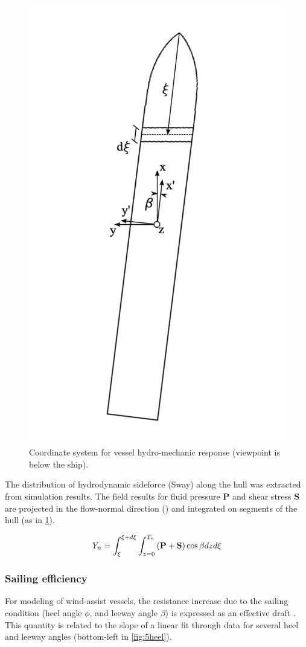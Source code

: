 \documentclass[twoside,twocolumn]{article}
\begin{document}
\begin{figure}[!ht]
	\centering
	\includegraphics[width=.7\columnwidth]{images/cut_coordinates.png}  %
	\caption{Coordinate system for vessel hydro-mechanic response (viewpoint is below the ship).}
	\label{fig:cutcoord}
\end{figure}

The distribution of hydrodynamic sideforce (Sway) along the hull was extracted from simulation results. The field results for fluid pressure $\mathbf{P}$ and shear stress $\mathbf{S}$ are projected in the flow-normal direction (\nY) and integrated on segments of the hull (as in \cref{fig:cutcoord}).

\begin{equation}
Y_n=\int_{\xi}^{\xi+d\xi} \int_{z=0}^{T_n} \left(\mathbf{P}+\mathbf{S}\right)  \cos{\beta} \space dz \space d\xi
\end{equation}

\subsubsection{Sailing efficiency}
For modeling of wind-assist vessels, the resistance increase due to the sailing condition (heel angle $\phi$, and leeway angle $\beta$) is expressed as an effective draft \Te. This quantity is related to the slope of a linear fit through data for several heel and leeway angles (bottom-left in \cref{fig:5heel}).
\end{document}
